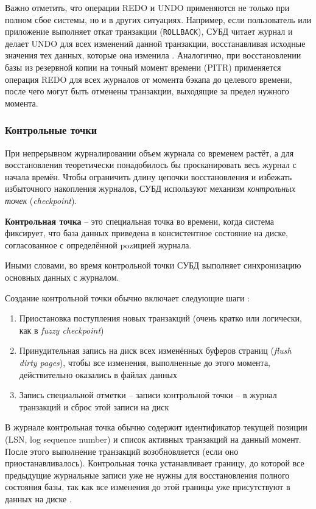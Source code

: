  Важно отметить, что операции REDO и UNDO применяются не только при полном сбое системы, но и в других ситуациях. Например, если пользователь или приложение выполняет откат транзакции (\texttt{ROLLBACK}), СУБД читает журнал и делает UNDO для всех изменений данной транзакции, восстанавливая исходные значения тех данных, которые она изменила \autocite{MicrosoftLearnSQLserverTransLog}. Аналогично, при восстановлении базы из резервной копии на точный момент времени (PITR) применяется операция REDO для всех журналов от момента бэкапа до целевого времени, после чего могут быть отменены транзакции, выходящие за предел нужного момента.

\subsubsection{Контрольные точки} 

 При непрерывном журналировании объем журнала со временем растёт, а для восстановления теоретически понадобилось бы просканировать весь журнал с начала времён. Чтобы ограничить длину цепочки восстановления и избежать избыточного накопления журналов, СУБД используют механизм \textit{контрольных точек} (\textit{checkpoint}). 
 \begin{grayquote}
    \textbf{Контрольная точка} – это специальная точка во времени, когда система фиксирует, что база данных приведена в консистентное состояние на диске, согласованное с определённой pozицией журнала. 
 \end{grayquote}
 Иными словами, во время контрольной точки СУБД выполняет синхронизацию основных данных с журналом. 
 
 Создание контрольной точки обычно включает следующие шаги \autocite{ElmasriNavathe}: 
 \begin{enumerate}
    \item Приостановка поступления новых транзакций (очень кратко или логически, как в \textit{fuzzy checkpoint})
    \item Принудительная запись на диск всех изменённых буферов страниц (\textit{flush dirty pages}), чтобы все изменения, выполненные до этого момента, действительно оказались в файлах данных
    \item Запись специальной отметки – записи контрольной точки – в журнал транзакций и сброс этой записи на диск
 \end{enumerate}
 
 В журнале контрольная точка обычно содержит идентификатор текущей позиции (LSN, log sequence number) и список активных транзакций на данный момент. После этого выполнение транзакций возобновляется (если оно приостанавливалось). Контрольная точка устанавливает границу, до которой все предыдущие журнальные записи уже не нужны для восстановления полного состояния базы, так как все изменения до этой границы уже присутствуют в данных на диске \autocite{ElmasriNavathe}. 
 
